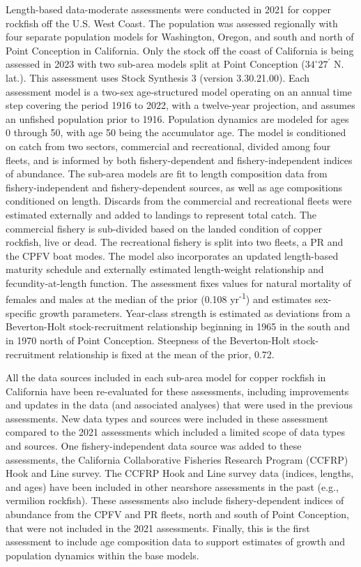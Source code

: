 \documentclass[11pt,
  english,
  letterpaper,
]{article}
\begin{document}
Length-based data-moderate assessments were conducted in 2021 for copper rockfish off the U.S. West Coast. The population was assessed regionally with four separate population models for Washington, Oregon, and south and north of Point Conception in California. Only the stock off the coast of California is being assessed in 2023 with two sub-area models split at Point Conception ($34^\circ 27^\prime$ N. lat.). This assessment uses Stock Synthesis 3 (version 3.30.21.00). Each assessment model is a two-sex age-structured model operating on an annual time step covering the period 1916 to 2022, with a twelve-year projection, and assumes an unfished population prior to 1916. Population dynamics are modeled for ages 0 through 50, with age 50 being the accumulator age. The model is conditioned on catch from two sectors, commercial and recreational, divided among four fleets, and is informed by both fishery-dependent and fishery-independent indices of abundance. The sub-area models are fit to length composition data from fishery-independent and fishery-dependent sources, as well as age compositions conditioned on length. Discards from the commercial and recreational fleets were estimated externally and added to landings to represent total catch. The commercial fishery is sub-divided based on the landed condition of copper rockfish, live or dead. The recreational fishery is split into two fleets, a PR and the CPFV boat modes. The model also incorporates an updated length-based maturity schedule and externally estimated length-weight relationship and fecundity-at-length function. The assessment fixes values for natural mortality of females and males at the median of the prior (0.108 yr\textsuperscript{-1}) and estimates sex-specific growth parameters. Year-class strength is estimated as deviations from a Beverton-Holt stock-recruitment relationship beginning in 1965 in the south and in 1970 north of Point Conception. Steepness of the Beverton-Holt stock-recruitment relationship is fixed at the mean of the prior, 0.72.

All the data sources included in each sub-area model for copper rockfish in California have been re-evaluated for these assessments, including improvements and updates in the data (and associated analyses) that were used in the previous assessments. New data types and sources were included in these assessment compared to the 2021 assessments which included a limited scope of data types and sources. One fishery-independent data source was added to these assessments, the California Collaborative Fisheries Research Program (CCFRP) Hook and Line survey. The CCFRP Hook and Line survey data (indices, lengths, and ages) have been included in other nearshore assessments in the past (e.g., vermilion rockfish). These assessments also include fishery-dependent indices of abundance from the CPFV and PR fleets, north and south of Point Conception, that were not included in the 2021 assessments. Finally, this is the first assessment to include age composition data to support estimates of growth and population dynamics within the base models.
\end{document}
